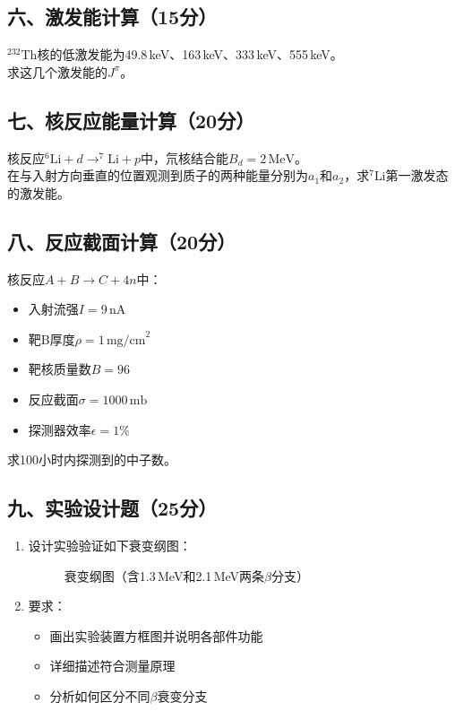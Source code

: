 \documentclass{article}
\begin{document}
\subsection*{六、激发能计算（15分）}
$^{232}$Th核的低激发能为49.8\,keV、163\,keV、333\,keV、555\,keV。\\
求这几个激发能的$J^{\pi}$。

\subsection*{七、核反应能量计算（20分）}
核反应$ ^6\text{Li} + d \rightarrow ^7\text{Li} + p $中，氘核结合能$B_d = 2\,\text{MeV}$。\\
在与入射方向垂直的位置观测到质子的两种能量分别为$a_1$和$a_2$，求$^7$Li第一激发态的激发能。

\subsection*{八、反应截面计算（20分）}
核反应$ A + B \rightarrow C + 4n $中：\\
\begin{itemize}
  \item 入射流强$I = 9\,\text{nA}$
  \item 靶B厚度$\rho = 1\,\text{mg/cm}^2$
  \item 靶核质量数$B = 96$
  \item 反应截面$\sigma = 1000\,\text{mb}$
  \item 探测器效率$\epsilon = 1\%$
\end{itemize}
求100小时内探测到的中子数。

\subsection*{九、实验设计题（25分）}
\begin{enumerate}
  \item 设计实验验证如下衰变纲图：
  \begin{figure}[h]
    \centering
    \caption{衰变纲图（含1.3\,MeV和2.1\,MeV两条$\beta$分支）}
  \end{figure}
  
  \item 要求：
  \begin{itemize}
    \item 画出实验装置方框图并说明各部件功能
    \item 详细描述符合测量原理
    \item 分析如何区分不同$\beta$衰变分支
  \end{itemize}
  \end{enumerate}
  
\end{document}
